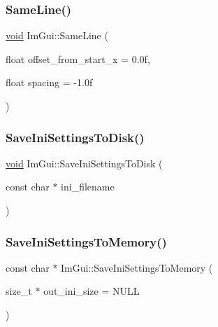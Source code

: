 \mbox{\label{namespaceImGui_a2991c91e94f3b77a0c3411f4f3aa348e}} 
\subsubsection{\texorpdfstring{Same\+Line()}{SameLine()}}
{\footnotesize\ttfamily \hyperlink{imgui__impl__opengl3__loader_8h_ac668e7cffd9e2e9cfee428b9b2f34fa7}{void} Im\+Gui\+::\+Same\+Line (\begin{DoxyParamCaption}\item[{float}]{offset\+\_\+from\+\_\+start\+\_\+x = {\ttfamily 0.0f},  }\item[{float}]{spacing = {\ttfamily -\/1.0f} }\end{DoxyParamCaption})}

\mbox{\label{namespaceImGui_afa4985e7810be4e687bc4ff28cec8a4d}} 
\subsubsection{\texorpdfstring{Save\+Ini\+Settings\+To\+Disk()}{SaveIniSettingsToDisk()}}
{\footnotesize\ttfamily \hyperlink{imgui__impl__opengl3__loader_8h_ac668e7cffd9e2e9cfee428b9b2f34fa7}{void} Im\+Gui\+::\+Save\+Ini\+Settings\+To\+Disk (\begin{DoxyParamCaption}\item[{const char $\ast$}]{ini\+\_\+filename }\end{DoxyParamCaption})}

\mbox{\label{namespaceImGui_a27043a530e0e842e01c279dd4207f9eb}} 
\subsubsection{\texorpdfstring{Save\+Ini\+Settings\+To\+Memory()}{SaveIniSettingsToMemory()}}
{\footnotesize\ttfamily const char $\ast$ Im\+Gui\+::\+Save\+Ini\+Settings\+To\+Memory (\begin{DoxyParamCaption}\item[{size\+\_\+t $\ast$}]{out\+\_\+ini\+\_\+size = {\ttfamily NULL} }\end{DoxyParamCaption})}


